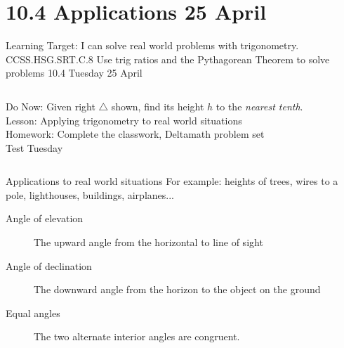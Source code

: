 \documentclass[onlytextwidth, aspectratio=169]{beamer}
\begin{document}
\section{10.4 Applications \hfill 25 April \,}
\begin{frame}{Learning Target: I can solve real world problems with trigonometry.}
  {CCSS.HSG.SRT.C.8 Use trig ratios and the Pythagorean Theorem to solve problems \hfill \alert{10.4 Tuesday 25 April}}
  \begin{columns}
    Do Now: Given right $\triangle$ shown, find its height $h$ to the \emph{nearest tenth}. \\[0.5cm]
    Lesson: Applying trigonometry to real world situations \\[0.5cm]
    Homework: Complete the classwork, Deltamath problem set \\
    \alert{Test Tuesday}
    \begin{flushright}
    \end{flushright}
  \end{columns}
\end{frame}

\begin{frame}{Applications to real world situations}
  For example: heights of trees, wires to a pole, lighthouses, buildings, airplanes...
  \begin{center}
  \end{center}
  \begin{description}
    \item[Angle of elevation] The upward angle from the horizontal to line of sight
    \item[Angle of declination] The downward angle from the horizon to the object on the ground
    \item[Equal angles] The two alternate interior angles are congruent.
  \end{description}
\end{frame}
\end{document}
